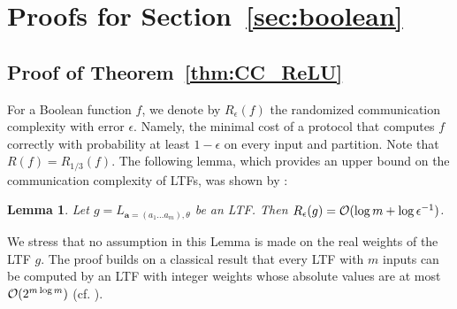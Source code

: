 \documentclass[11pt]{article}
\newtheorem{lemma}{Lemma}[section]
\newcommand{\ba}{\mathbf{a}}
\newcommand{\co}{{\cal O}}
\begin{document}
\section{Proofs for Section~\ref{sec:boolean}}

\subsection{Proof of Theorem~\ref{thm:CC_ReLU}}
\label{app:proof of theorem cc ReLU}

For a Boolean function $f$, we denote by $R_{\epsilon}(f)$ the randomized communication complexity with error $\epsilon$. Namely, the minimal cost of a protocol that computes $f$ correctly with probability at least $1-\epsilon$ on every input and partition. Note that  $R(f) = R_{1/3}(f)$.
%
The following lemma, which provides an upper bound on the communication complexity of LTFs, was shown by \cite{nisan1993communication} :
\begin{lemma}
	\label{lemma:from nisan}
	Let $g=L_{\ba=(a_1 \ldots a_m), \theta}$ be an LTF. Then $R_{\epsilon}(g)=\co(\log m + \log \epsilon^{-1})$.
\end{lemma}
We stress that no assumption in this Lemma is made on the real weights of the LTF $g$. The proof builds on a classical result 
that every LTF with $m$ inputs can be computed by an LTF with integer weights 
whose absolute values are at most 
$\co(2^{m \log m})$ (cf. \cite{goldmann1998simulating,goldmann1992majority}).
	
\end{document}
